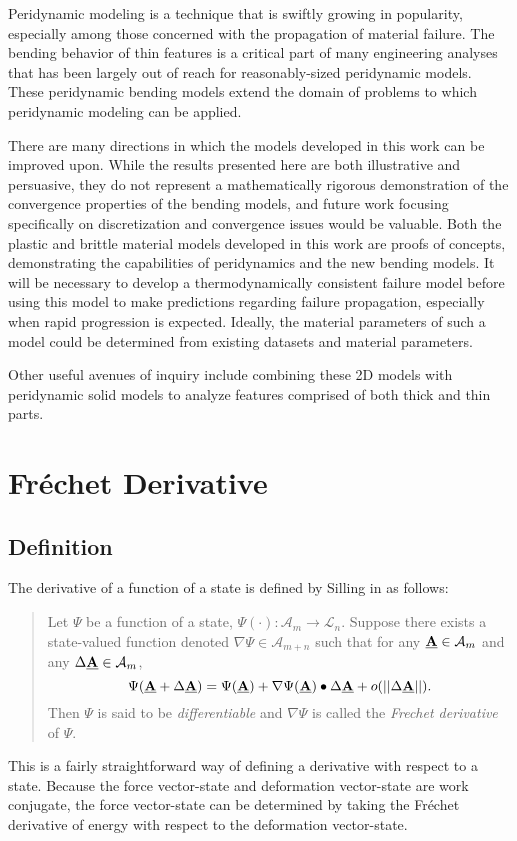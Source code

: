 Peridynamic modeling is a technique that is swiftly growing in popularity, especially among those concerned with the propagation of material failure.
The bending behavior of thin features is a critical part of many engineering analyses that has been largely out of reach for reasonably-sized peridynamic models. 
These peridynamic bending models extend the domain of problems to which peridynamic modeling can be applied. 

There are many directions in which the models developed in this work can be improved upon.
While the results presented here are both illustrative and persuasive, they do not represent a mathematically rigorous demonstration of the convergence properties of the bending models, and future work focusing specifically on discretization and convergence issues would be valuable.
Both the plastic and brittle material models developed in this work are proofs of concepts, demonstrating the capabilities of peridynamics and the new bending models.
It will be necessary to develop a thermodynamically consistent failure model before using this model to make predictions regarding failure propagation, especially when rapid progression is expected.
Ideally, the material parameters of such a model could be determined from existing datasets and material parameters.

Other useful avenues of inquiry include combining these 2D models with peridynamic solid models to analyze features comprised of both thick and thin parts.

\appendix
\chapter{Fr\'echet Derivative}
\label{sec:frechet}
\section{Definition}
The derivative of a function of a state is defined by Silling in \cite{silling2007peridynamic} as follows:
\begin{quote}
Let $\Psi$ be a function of a state, $\Psi(\cdot):\mathcal{A}_m\rightarrow\mathcal{L}_n$. Suppose there exists a state-valued function denoted $\nabla\Psi\in\mathcal{A}_{m+n}$ such that for any $\vstate{A}{}{}\in\mathcal{A}_m$ and any $\Delta\vstate{A}{}{}\in\mathcal{A}_m$,
\begin{equation}
  \Psi(\vstate{A}{}{}+\Delta\vstate{A}{}{})=\Psi(\vstate{A}{}{})+\nabla\Psi(\vstate{A}{}{})\bullet\Delta\vstate{A}{}{}+o(||\Delta\vstate{A}{}{}||).
\end{equation}
Then $\Psi$ is said to be \textit{differentiable} and $\nabla\Psi$ is called the \textit{Frechet derivative} of $\Psi$.
\end{quote}
This is a fairly straightforward way of defining a derivative with respect to a state.
Because the force vector-state and deformation vector-state are work conjugate, the force vector-state can be determined by taking the Fr\'echet derivative of energy with respect to the deformation vector-state.
